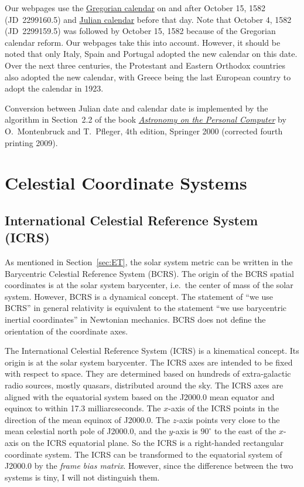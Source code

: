 \documentclass[12pt]{article}
\begin{document}
Our webpages use the \href{https://en.wikipedia.org/wiki/Gregorian_calendar}{Gregorian calendar} 
on and after October 15, 1582 (JD~2299160.5) and 
\href{https://en.wikipedia.org/wiki/Julian_calendar}{Julian calendar} before that day. 
Note that October 4, 1582 (JD~2299159.5) was followed by October 15, 1582 because 
of the Gregorian calendar reform. Our webpages take this into account. 
However, it should be noted that only Italy, Spain and Portugal adopted 
the new calendar on this date. Over the next three centuries, the Protestant 
and Eastern Orthodox countries also adopted the new calendar, with Greece 
being the last European country to adopt the calendar in 1923. 

Conversion between Julian date and calendar date is implemented by the algorithm 
in Section~2.2 of the book \href{https://www.springer.com/us/book/9783540672210#}
{\it Astronomy on the Personal Computer} by 
O.~Montenbruck and T.~Pfleger, 4th edition, Springer 2000 (corrected fourth 
printing 2009).

\section{Celestial Coordinate Systems}
\label{sec:coordSys}

\subsection{International Celestial Reference System (ICRS)} 

As mentioned in Section~\ref{sec:ET}, the solar system metric can be 
written in the Barycentric Celestial Reference System (BCRS). The origin of the 
BCRS spatial coordinates is at the solar system barycenter, i.e.\ the center 
of mass of the solar system. However, BCRS is a dynamical concept. The 
statement of ``we use BCRS'' in general relativity is equivalent to the 
statement ``we use barycentric inertial coordinates'' in Newtonian 
mechanics. BCRS does not define the orientation of the coordinate axes. 

The International Celestial Reference System (ICRS) is a kinematical concept. Its 
origin is at the solar system barycenter. The ICRS axes are intended to be 
fixed with respect to space. They are 
determined based on hundreds of extra-galactic radio sources, mostly quasars, distributed 
around the sky. The ICRS axes are aligned with the equatorial system based on 
the J2000.0 mean equator and equinox to within 17.3 milliarcseconds. The $x$-axis 
of the ICRS points in the direction of the mean equinox of J2000.0. The $z$-axis 
points very close to the mean celestial north pole of J2000.0, and the $y$-axis 
is $90^\circ$ to the east of the $x$-axis on the ICRS equatorial plane. So the ICRS 
is a right-handed rectangular coordinate system. The ICRS can be transformed to the 
equatorial system of J2000.0 by the {\em frame bias matrix}. However, since the 
difference between the two systems is tiny, I will not distinguish them.
\end{document}
